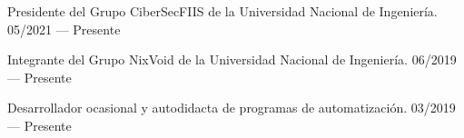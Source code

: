 Presidente del Grupo CiberSecFIIS de la Universidad Nacional de Ingeniería.	\hfill 05/2021 --- Presente
 
Integrante del Grupo NixVoid de la Universidad Nacional de Ingeniería.	\hfill 06/2019 --- Presente

Desarrollador ocasional y autodidacta de programas de automatización.	\hfill 03/2019 --- Presente




